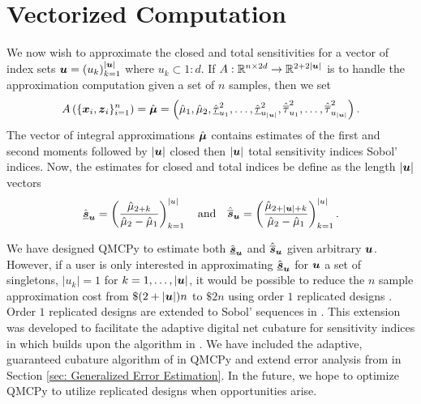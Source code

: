 \documentclass{article}
\begin{document}
\section{Vectorized Computation}

We now wish to approximate the closed and total sensitivities for a vector of index sets $\boldsymbol{u} = \left(u_k\right)_{k=1}^{\lvert \boldsymbol{u} \rvert}$ where $u_k \subset 1:d$. If $A: \mathbb{R}^{n \times 2d} \to \mathbb{R}^{2+2\lvert \boldsymbol{u} \rvert}$ is to handle the approximation computation given a set of $n$ samples, then we set
\begin{equation}
    \label{eq:bmuhat_approx}
    A\left(\{\boldsymbol{x}_i,\boldsymbol{z}_i\}_{i=1}^n\right) = \hat{\boldsymbol{\mu}} = \left(\hat{\mu}_1,\hat{\mu}_2,\hat{\underline{\tau}}_{u_1}^2,\dots,\hat{\underline{\tau}}_{u_{\lvert \boldsymbol{u} \rvert}}^2,\hat{\overline{\tau}}_{u_1}^2,\dots,\hat{\overline{\tau}}_{u_{\lvert \boldsymbol{u} \rvert}}^2\right).
\end{equation}
The vector of integral approximations $\hat{\boldsymbol{\mu}}$ contains estimates of the first and second moments followed by $\lvert \boldsymbol{u} \rvert$ closed then $\lvert \boldsymbol{u} \rvert$ total sensitivity indices Sobol' indices. Now, the  estimates for closed and total indices be define as the length $\lvert \boldsymbol{u} \rvert$ vectors
\begin{equation}
    \label{eq:sensitivity_indices_vec}
    \hat{\underline{\boldsymbol{s}}}_{\boldsymbol{u}} = \left(\frac{\hat{\mu}_{2+k}}{\hat{\mu}_2-\hat{\mu}_1}\right)_{k=1}^{\lvert u \rvert} \quad \text{and} \quad 
    \hat{\overline{\boldsymbol{s}}}_{\boldsymbol{u}} = \left(\frac{\hat{\mu}_{2+\lvert \boldsymbol{u} \rvert + k}}{\hat{\mu}_2-\hat{\mu}_1}\right)_{k=1}^{\lvert u \rvert}.
\end{equation}

We have designed QMCPy to estimate both $\hat{\underline{\boldsymbol{s}}}_{\boldsymbol{u}}$ and $\hat{\overline{\boldsymbol{s}}}_{\boldsymbol{u}}$ given arbitrary $\boldsymbol{u}$. However, if a user is only interested in approximating $\hat{\underline{\boldsymbol{s}}}_{\boldsymbol{u}}$ for $\boldsymbol{u}$ a set of singletons, $\lvert u_k \rvert = 1$ for $k=1, \dots, \lvert \boldsymbol{u} \rvert$, it would be possible to reduce the $n$ sample approximation cost from $\$(2+\lvert \boldsymbol{u} \rvert)n$ to $\$2n$ using order $1$ replicated designs \cite{alex2008comparison,tissot2015randomized}. Order $1$ replicated designs are extended to Sobol' sequences  in \cite{replicated_designs_sobol_seq}. This extension was developed to facilitate the adaptive digital net cubature for sensitivity indices in \cite{reliable_sobol_indices_approx} which builds upon the algorithm in \cite{cubqmcsobol}. We have included the adaptive, guaranteed cubature algorithm of \cite{cubqmcsobol} in QMCPy and extend error analysis from \cite{reliable_sobol_indices_approx} in Section \ref{sec: Generalized Error Estimation}. In the future, we hope to optimize QMCPy to utilize replicated designs when opportunities arise.
\end{document}
